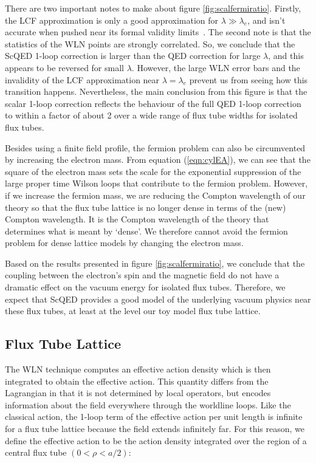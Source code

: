 There are two important notes to make about figure \ref{fig:scalfermiratio}. 
Firstly, the \ac{LCF} approximation is only a good approximation 
for $\lambda \gg \lambda_e$, and isn't accurate when pushed near its formal 
validity limits~\cite{MoyaertsLaurent:2004}. The second note is that the 
statistics of the \ac{WLN} points are strongly correlated. So, we conclude 
that the \ac{ScQED} 1-loop correction is larger than the \ac{QED} correction 
for large $\lambda$, and this appears to be reversed for small $\lambda$. 
However, the large \ac{WLN} error bars and the invalidity of the 
\ac{LCF} approximation near $\lambda = \lambda_e$ prevent us from 
seeing how this transition happens. Nevertheless, the main 
conclusion from this figure is that the scalar 1-loop correction 
reflects the behaviour of the full \ac{QED} 1-loop correction 
to within a factor of about 2 over a wide range of flux tube widths 
for isolated flux tubes.

Besides using a finite field profile, the fermion problem can also be circumvented by increasing
the electron mass. 
From equation (\ref{eqn:cylEA}), we can see that the square of the electron mass 
sets the scale for the exponential suppression of the large proper time Wilson loops that 
contribute to the fermion problem. However, if we increase the fermion mass, we are 
reducing the Compton wavelength of our theory so that the flux tube lattice is no longer 
dense in terms of the (new) Compton wavelength. It is the Compton wavelength of the theory that 
determines what is meant by `dense'. We therefore cannot avoid the fermion 
problem for dense lattice models by changing the electron mass.

Based on the results presented in figure \ref{fig:scalfermiratio}, we conclude that the coupling between the electron's spin 
and the magnetic field do not have a dramatic effect on the vacuum 
energy for isolated flux tubes. Therefore, we expect that \ac{ScQED} provides a good model of the 
underlying vacuum physics near these flux tubes, at least at the level our toy model 
flux tube lattice. 


\subsection{Flux Tube Lattice}

The \ac{WLN} technique computes an effective action density which is then integrated to 
obtain the effective action. This quantity differs from the Lagrangian in that it is 
not determined by local operators, but encodes information about the field everywhere
through the worldline loops.
Like the classical action, the 1-loop term of the effective action per unit length 
is infinite for a flux tube lattice because the field extends infinitely far. 
For this reason, we define the effective action to be the action density integrated 
over the region of a central flux tube $(0<\rho<a/2)$:

